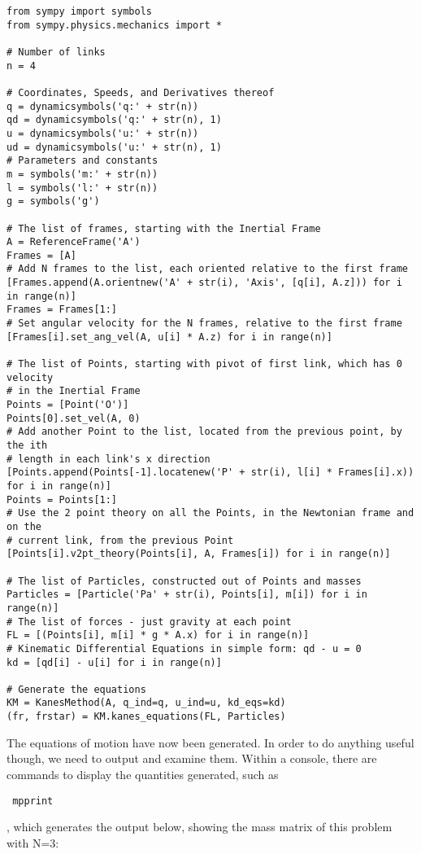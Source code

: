 \documentclass[twocolumn,10pt]{asme2e}
\begin{document}
\begin{figure*}[tb]
\begin{Verbatim}[frame=single]
from sympy import symbols
from sympy.physics.mechanics import *

# Number of links
n = 4

# Coordinates, Speeds, and Derivatives thereof
q = dynamicsymbols('q:' + str(n))
qd = dynamicsymbols('q:' + str(n), 1)
u = dynamicsymbols('u:' + str(n))
ud = dynamicsymbols('u:' + str(n), 1)
# Parameters and constants
m = symbols('m:' + str(n))
l = symbols('l:' + str(n))
g = symbols('g')

# The list of frames, starting with the Inertial Frame
A = ReferenceFrame('A')
Frames = [A]
# Add N frames to the list, each oriented relative to the first frame
[Frames.append(A.orientnew('A' + str(i), 'Axis', [q[i], A.z])) for i in range(n)]
Frames = Frames[1:]
# Set angular velocity for the N frames, relative to the first frame
[Frames[i].set_ang_vel(A, u[i] * A.z) for i in range(n)]

# The list of Points, starting with pivot of first link, which has 0 velocity
# in the Inertial Frame
Points = [Point('O')]
Points[0].set_vel(A, 0)
# Add another Point to the list, located from the previous point, by the ith
# length in each link's x direction
[Points.append(Points[-1].locatenew('P' + str(i), l[i] * Frames[i].x)) for i in range(n)]
Points = Points[1:]
# Use the 2 point theory on all the Points, in the Newtonian frame and on the
# current link, from the previous Point
[Points[i].v2pt_theory(Points[i], A, Frames[i]) for i in range(n)]

# The list of Particles, constructed out of Points and masses
Particles = [Particle('Pa' + str(i), Points[i], m[i]) for i in range(n)]
# The list of forces - just gravity at each point
FL = [(Points[i], m[i] * g * A.x) for i in range(n)]
# Kinematic Differential Equations in simple form: qd - u = 0
kd = [qd[i] - u[i] for i in range(n)]

# Generate the equations
KM = KanesMethod(A, q_ind=q, u_ind=u, kd_eqs=kd)
(fr, frstar) = KM.kanes_equations(FL, Particles)
\end{Verbatim}
\end{figure*}

The equations of motion have now been generated.
In order to do anything useful though, we need to output and examine them.
Within a console, there are commands to display the quantities generated, such
as \begin{verbatim} mpprint \end{verbatim}, which generates the output below, showing the mass matrix of this
problem with N=3:
\end{document}

